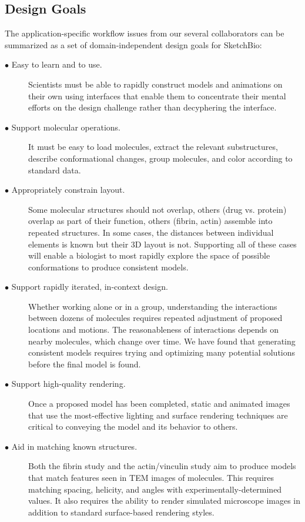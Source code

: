 \documentclass[twocolumn]{bmcart}%
\begin{document}
\subsection*{Design Goals}
The application-specific workflow issues from our several collaborators can be summarized as a set of domain-independent design goals for SketchBio:
\begin{description}
  \item[$\bullet$ Easy to learn and to use.] Scientists must be able to rapidly construct models and animations on their own using interfaces that enable them to concentrate their mental efforts on the design challenge rather than decyphering the interface.
  \item[$\bullet$ Support molecular operations.] It must be easy to load molecules, extract the relevant substructures, describe conformational changes, group molecules, and color according to standard data.
  \item[$\bullet$ Appropriately constrain layout.] Some molecular structures should not overlap, others (drug vs. protein) overlap as part of their function, others (fibrin, actin) assemble into repeated structures.  In some cases, the distances between individual elements is known but their 3D layout is not.  Supporting all of these cases will enable a biologist to most rapidly explore the space of possible conformations to produce consistent models.
  \item[$\bullet$ Support rapidly iterated, in-context design.] Whether working alone or in a group, understanding the interactions between dozens of molecules requires repeated adjustment of proposed locations and motions.  The reasonableness of interactions depends on nearby molecules, which change over time.  We have found that generating consistent models requires trying and optimizing many potential solutions before the final model is found.
  \item[$\bullet$ Support high-quality rendering.] Once a proposed model has been completed, static and animated images that use the most-effective lighting and surface rendering techniques are critical to conveying the model and its behavior to others.
  \item[$\bullet$ Aid in matching known structures.] Both the fibrin study and the actin/vinculin study aim to produce models that match features seen in TEM images of molecules.  This requires matching spacing, helicity, and angles with experimentally-determined values.  It also requires the ability to render simulated microscope images in addition to standard surface-based rendering styles.
\end{description}
\end{document}
